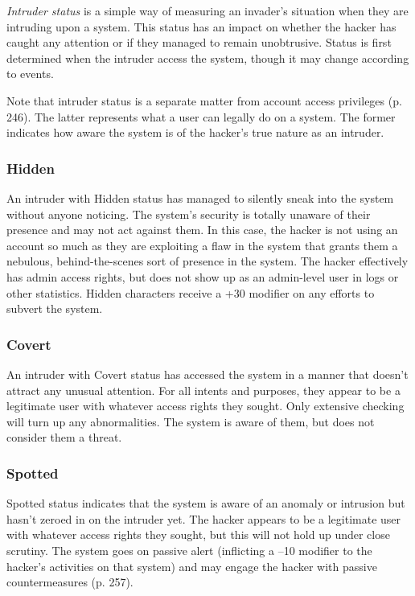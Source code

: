 \textit{Intruder status} is a simple way of measuring an invader's situation when they are intruding upon a system. This status has an impact on whether the hacker has caught any attention or if they managed to remain unobtrusive. Status is first determined when the intruder access the system, though it may change according to events. 

Note that intruder status is a separate matter from account access privileges (p. 246). The latter represents what a user can legally do on a system. The former indicates how aware the system is of the hacker's true nature as an intruder. 

\subsubsection{Hidden} 

An intruder with Hidden status has managed to silently sneak into the system without anyone noticing. The system's security is totally unaware of their presence and may not act against them. In this case, the hacker is not using an account so much as they are exploiting a flaw in the system that grants them a nebulous, behind-the-scenes sort of presence in the system. The hacker effectively has admin access rights, but does not show up as an admin-level user in logs or other statistics. Hidden characters receive a +30 modifier on any efforts to subvert the system. 

\subsubsection{Covert} 

An intruder with Covert status has accessed the system in a manner that doesn't attract any unusual attention. For all intents and purposes, they appear to be a legitimate user with whatever access rights they sought. Only extensive checking will turn up any abnormalities. The system is aware of them, but does not consider them a threat. 

\subsubsection{Spotted} 

Spotted status indicates that the system is aware of an anomaly or intrusion but hasn't zeroed in on the intruder yet. The hacker appears to be a legitimate user with whatever access rights they sought, but this will not hold up under close scrutiny. The system goes on passive alert (inflicting a –10 modifier to the hacker's activities on that system) and may engage the hacker with passive countermeasures (p. 257). 

